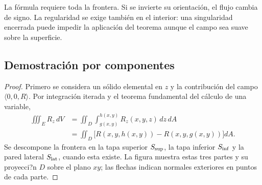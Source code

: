 La fórmula requiere toda la frontera. Si se invierte su orientación, el flujo cambia de signo. La regularidad se exige también en el interior: una singularidad encerrada puede impedir la aplicación del teorema aunque el campo sea suave sobre la superficie.

\subsection{Demostración por componentes}

\begin{proof}
Primero se considera un sólido elemental en $z$ y la contribución del campo $\langle0,0,R\rangle$. Por integración iterada y el teorema fundamental del cálculo de una variable,
\begin{align*}
\iiint_E R_z\,dV
&=\iint_D\int_{g(x,y)}^{h(x,y)}R_z(x,y,z)\,dz\,dA\\
&=\iint_D\bigl[R(x,y,h(x,y))-R(x,y,g(x,y))\bigr]dA.
\end{align*}
Se descompone la frontera en la tapa superior $S_{\rm sup}$, la tapa inferior $S_{\rm inf}$ y la pared lateral $S_{\rm lat}$, cuando esta existe. La figura muestra estas tres partes y su proyecci?n $D$ sobre el plano $xy$; las flechas indican normales exteriores en puntos de cada parte.


\end{proof}
